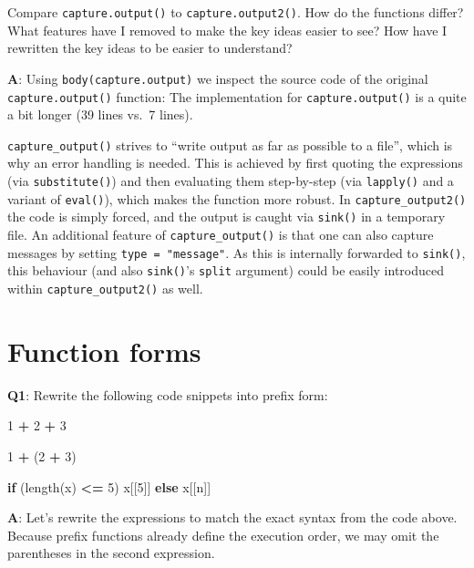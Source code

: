 \documentclass[
]{krantz}
\makeatletter
\newenvironment{Shaded}{\begin{snugshade}}{\end{snugshade}}
\newcommand{\ControlFlowTok}[1]{\textcolor[rgb]{0.13,0.29,0.53}{\textbf{#1}}}
\newcommand{\DecValTok}[1]{\textcolor[rgb]{0.00,0.00,0.81}{#1}}
\newcommand{\KeywordTok}[1]{\textcolor[rgb]{0.13,0.29,0.53}{\textbf{#1}}}
\newcommand{\NormalTok}[1]{#1}
\newcommand{\OperatorTok}[1]{\textcolor[rgb]{0.81,0.36,0.00}{\textbf{#1}}}
\newcommand{\StringTok}[1]{\textcolor[rgb]{0.31,0.60,0.02}{#1}}
\newenvironment{kframe}{%
\medskip{}
\setlength{\fboxsep}{.8em}
 \def\at@end@of@kframe{}%
 \ifinner\ifhmode%
  \def\at@end@of@kframe{\end{minipage}}%
  \begin{minipage}{\columnwidth}%
 \fi\fi%
 \def\FrameCommand##1{\hskip\@totalleftmargin \hskip-\fboxsep
 \colorbox{shadecolor}{##1}\hskip-\fboxsep
     \hskip-\linewidth \hskip-\@totalleftmargin \hskip\columnwidth}%
 \MakeFramed {\advance\hsize-\width
   \@totalleftmargin\z@ \linewidth\hsize
   \@setminipage}}%
 {\par\unskip\endMakeFramed%
 \at@end@of@kframe}
\renewenvironment{Shaded}{\begin{kframe}}{\end{kframe}}
\renewcommand{\KeywordTok} [1]{\textcolor[rgb]{0.00,0.44,0.13}{{#1}}}
\renewcommand{\DecValTok}  [1]{\textcolor[rgb]{0.25,0.63,0.44}{{#1}}}
\renewcommand{\StringTok}  [1]{\textcolor[rgb]{0.25,0.44,0.63}{{#1}}}
\renewcommand{\NormalTok}  [1]{{#1}}
\makeatother
\begin{document}
Compare \texttt{capture.output()} to \texttt{capture.output2()}. How do the functions differ? What features have I removed to make the key ideas easier to see? How have I rewritten the key ideas to be easier to understand?

\textbf{{A}}: Using \texttt{body(capture.output)} we inspect the source code of the original \texttt{capture.output()} function: The implementation for \texttt{capture.output()} is a quite a bit longer (39 lines vs.~7 lines).

\texttt{capture\_output()} strives to ``write output as far as possible to a file'', which is why an error handling is needed. This is achieved by first quoting the expressions (via \texttt{substitute()}) and then evaluating them step-by-step (via \texttt{lapply()} and a variant of \texttt{eval()}), which makes the function more robust. In \texttt{capture\_output2()} the code is simply forced, and the output is caught via \texttt{sink()} in a temporary file. An additional feature of \texttt{capture\_output()} is that one can also capture messages by setting \texttt{type\ =\ "message"}. As this is internally forwarded to \texttt{sink()}, this behaviour (and also \texttt{sink()}'s \texttt{split} argument) could be easily introduced within \texttt{capture\_output2()} as well.

\hypertarget{function-forms}{%
\section{Function forms}\label{function-forms}}

\textbf{{Q1}}: Rewrite the following code snippets into prefix form:

\begin{Shaded}
\begin{Highlighting}[]
\DecValTok{1} \OperatorTok{+}\StringTok{ }\DecValTok{2} \OperatorTok{+}\StringTok{ }\DecValTok{3}

\DecValTok{1} \OperatorTok{+}\StringTok{ }\NormalTok{(}\DecValTok{2} \OperatorTok{+}\StringTok{ }\DecValTok{3}\NormalTok{)}

\ControlFlowTok{if}\NormalTok{ (}\KeywordTok{length}\NormalTok{(x) }\OperatorTok{<=}\StringTok{ }\DecValTok{5}\NormalTok{) x[[}\DecValTok{5}\NormalTok{]] }\ControlFlowTok{else}\NormalTok{ x[[n]]}
\end{Highlighting}
\end{Shaded}

\textbf{{A}}: Let's rewrite the expressions to match the exact syntax from the code above. Because prefix functions already define the execution order, we may omit the parentheses in the second expression.
\end{document}
